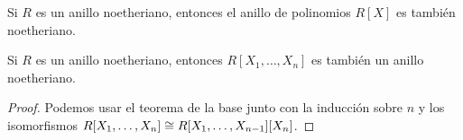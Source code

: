 \begin{teorema}
  \label{thm:teorema-de-la-base}
  Si $R$ es un anillo noetheriano, entonces el anillo de polinomios $R [X]$ es
  también noetheriano.
\end{teorema}

\begin{corolario}
  Si $R$ es un anillo noetheriano, entonces $R [X_1,\ldots,X_n]$ es también
  un anillo noetheriano.

  \begin{proof}
    Podemos usar el teorema de la base junto con la inducción sobre $n$ y
    los isomorfismos $R [X_1,\ldots,X_n] \cong R [X_1,\ldots,X_{n-1}] [X_n]$.
  \end{proof}
\end{corolario}


